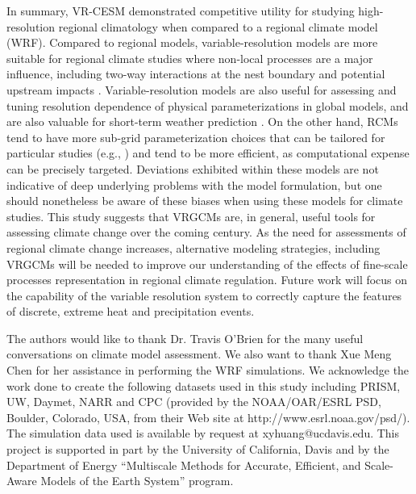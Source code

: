 \documentclass[ms]{agutex}   %
\begin{document}
\begin{article}

In summary, VR-CESM demonstrated competitive utility for studying high-resolution regional climatology when compared to a regional climate model (WRF). Compared to regional models, variable-resolution models are more suitable for regional climate studies where non-local processes are a major influence, including two-way interactions at the nest boundary and potential upstream impacts \citep{sakaguchi2015exploring}.  Variable-resolution models are also useful for assessing and tuning resolution dependence of physical parameterizations in global models, and are also valuable for short-term weather prediction \citep{zarzycki2015experimental}. On the other hand, RCMs tend to have more sub-grid parameterization choices that can be tailored for particular studies (e.g., \citep{cassano2011performance}) and tend to be more efficient, as computational expense can be precisely targeted. Deviations exhibited within these models are not indicative of deep underlying problems with the model formulation, but one should nonetheless be aware of these biases when using these models for climate studies. This study suggests that VRGCMs are, in general, useful tools for assessing climate change over the coming century. As the need for assessments of regional climate change increases, alternative modeling strategies, including VRGCMs will be needed to improve our understanding of the effects of fine-scale processes representation in regional climate regulation. Future work will focus on the capability of the variable resolution system to correctly capture the features of discrete, extreme heat and precipitation events.



\begin{acknowledgments}


The authors would like to thank Dr. Travis O'Brien for the many useful conversations on climate model assessment. We also want to thank Xue Meng Chen for her assistance in performing the WRF simulations. We acknowledge the work done to create the following datasets used in this study including PRISM, UW, Daymet, NARR and CPC (provided by the NOAA/OAR/ESRL PSD, Boulder, Colorado, USA, from their Web site at http://www.esrl.noaa.gov/psd/). The simulation data used is available by request at xyhuang@ucdavis.edu. This project is supported in part by the University of California, Davis and by the Department of Energy ``Multiscale Methods for Accurate, Efficient, and Scale-Aware Models of the Earth System'' program. 
\end{acknowledgments}


\end{article}
\end{document}
